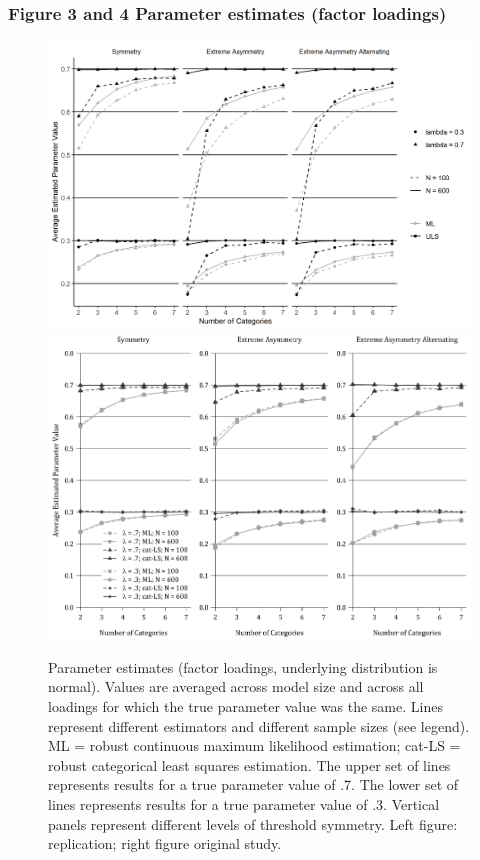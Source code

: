 \documentclass[10,a4paperpaper,]{article}
\begin{document}
\subsubsection{Figure 3 and 4 Parameter estimates (factor loadings)}

\begin{figure}
\includegraphics[width=0.49\linewidth]{./figures/fig_3} \includegraphics[width=0.49\linewidth]{./figures/fig3_original} \caption{Parameter estimates (factor loadings, underlying distribution is normal). Values are averaged across model size and across all loadings for which the true parameter value was the same. Lines represent different estimators and different sample sizes (see legend). ML = robust continuous maximum likelihood estimation; cat-LS = robust categorical least squares estimation. The upper set of lines represents results for a true parameter value of .7. The lower set of lines represents results for a true parameter value of .3. Vertical panels represent different levels of threshold symmetry. Left figure: replication; right figure original study.}\label{fig:fig3}
\end{figure}
\end{document}
